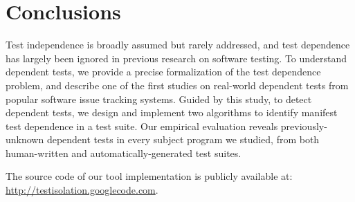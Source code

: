 \section{Conclusions}
\label{sec:questions}

Test independence is broadly assumed but rarely addressed, and
test dependence has largely been ignored in previous
research on software testing. To understand
dependent tests, we provide a
precise formalization of the test dependence problem,
and describe one of the first studies on real-world dependent
tests from popular software issue tracking systems. Guided by
this study, to detect dependent tests, we design
and implement two algorithms to identify manifest test dependence
in a test suite. Our empirical evaluation reveals
previously-unknown dependent tests in every subject program
we studied, from both human-written and automatically-generated test
suites.

The source code of our tool implementation is publicly
available at: \url{http://testisolation.googlecode.com}.
